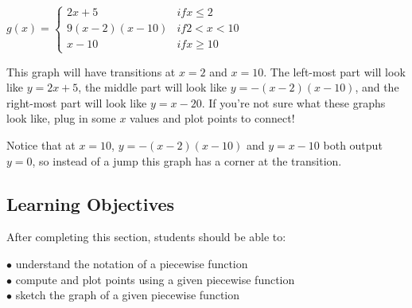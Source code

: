 \documentclass{ximera}
\begin{document}
\begin{example}
$g(x)=\begin{cases} 2x+5 & \textit{if}x\leq 2\\ 9(x-2)(x-10) & \textit{if} 2<x<10\\ x-10 & \textit{if} x\geq 10\end{cases}$

This graph will have transitions at $x=2$ and $x=10$. The left-most part will look like $y=2x+5$, the middle part will look like $y=-(x-2)(x-10)$, and the right-most part will look like $y=x-20$. If you're not sure what these graphs look like, plug in some $x$ values and plot points to connect!


Notice that at $x=10$, $y=-(x-2)(x-10)$ and $y=x-10$ both output $y=0$, so instead of a jump this graph has a corner at the transition.
\end{example}

\subsection*{Learning Objectives}
After completing this section, students should be able to:
\vspace{.05in}

\noindent$\bullet$ understand the notation of a piecewise function
\\$\bullet$ compute and plot points using a given piecewise function
\\$\bullet$ sketch the graph of a given piecewise function
\end{document}
